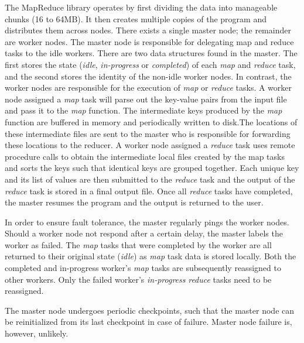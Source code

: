 \documentclass{report}
\begin{document}
        The MapReduce library operates by first dividing the data 
        into manageable chunks (16 to 64MB). It then creates 
        multiple copies of the program and distributes them across
        nodes. There exists a single master node; the remainder are
        worker nodes. The master node is responsible for delegating 
        map and reduce tasks to the idle workers. There are two data
        structures found in the master. The first stores the state 
        (\textit{idle}, \textit{in-progress} or \textit{completed}) 
        of each \textit{map} and \textit{reduce} task, and the second
        stores the identity of the non-idle worker nodes. In contrast,
        the worker nodes are responsible for the execution of 
        \textit{map} or \textit{reduce} tasks. A worker node assigned
        a \textit{map} task will parse out the key-value pairs from 
        the input file and pass it to the \textit{map} function. The 
        intermediate keys produced by the \textit{map} function are 
        buffered in memory and periodically written to disk.The 
        locations of these intermediate files are sent to the master 
        who is responsible for forwarding these locations to the 
        reducer. A worker node assigned a \textit{reduce} task uses 
        remote procedure calls to obtain the intermediate local files
        created by the map tasks and sorts the keys such that identical
        keys are grouped together. Each unique key and its list of 
        values are then submitted to the \textit{reduce} task and the 
        output of the \textit{reduce} task is stored in a final output 
        file. Once all \textit{reduce} tasks have completed, the master
        resumes the program and the output is returned to the user.

        In order to ensure fault tolerance, the master regularly pings 
        the worker nodes. Should a worker node not respond after a certain
        delay, the master labels the worker as failed. The \textit{map} 
        tasks that were completed by the worker are all returned to their
        original state (\textit{idle}) as \textit{map} task data is stored
        locally. Both the completed and in-progress worker's \textit{map}
        tasks are subsequently reassigned to other workers. Only the failed
        worker's \textit{in-progress} \textit{reduce} tasks need to be 
        reassigned.

        The master node undergoes periodic checkpoints, such that the 
        master node can be reinitialized from its last checkpoint in 
        case of failure. Master node failure is, however, unlikely.
\end{document}
